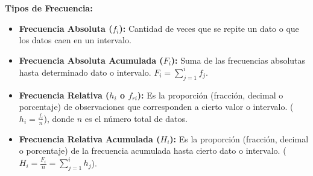 \documentclass[12pt, letterpaper]{article}
\begin{document}
\textbf{Tipos de Frecuencia:}
\begin{itemize}
    \item \textbf{Frecuencia Absoluta ($f_i$):} Cantidad de veces que se repite un dato o que los datos caen en un intervalo.
    \item \textbf{Frecuencia Absoluta Acumulada ($F_i$):} Suma de las frecuencias absolutas hasta determinado dato o intervalo. $F_i = \sum_{j=1}^{i} f_j$.
    \item \textbf{Frecuencia Relativa ($h_i$ o $f_{ri}$):} Es la proporción (fracción, decimal o porcentaje) de observaciones que corresponden a cierto valor o intervalo. ($h_i = \frac{f_i}{n}$), donde $n$ es el número total de datos.
    \item \textbf{Frecuencia Relativa Acumulada ($H_i$):} Es la proporción (fracción, decimal o porcentaje) de la frecuencia acumulada hasta cierto dato o intervalo. ($H_i = \frac{F_i}{n} = \sum_{j=1}^{i} h_j$).
\end{itemize}
\newpage
\end{document}
